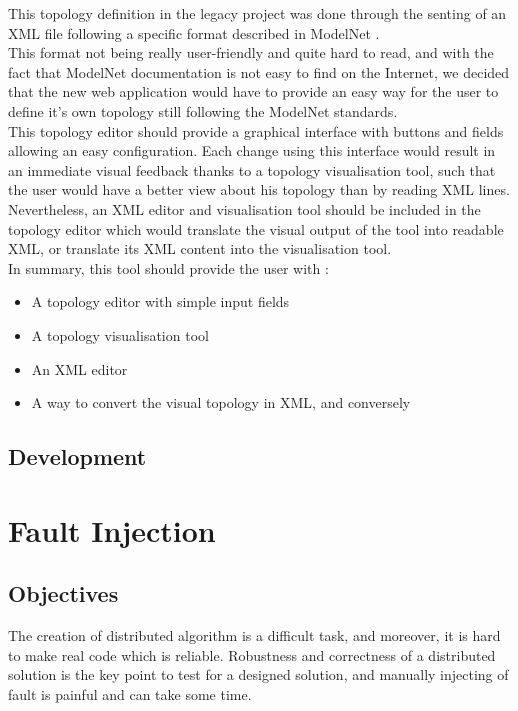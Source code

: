 \documentclass{eplmastersthesis}
\begin{document}
        This topology definition in the legacy project was done through
        the senting of an XML file following a specific format described
        in ModelNet \cite{ModelNet}.\\
        This format not being really user-friendly and quite hard to read,
        and with the fact that ModelNet documentation is not easy to find
        on the Internet, we decided that the new web application would have
        to provide an easy way for the user to define it's own topology
        still following the ModelNet standards.\\

        This topology editor should provide a graphical interface with
        buttons and fields allowing an easy configuration. Each change
        using this interface would result in an immediate visual feedback
        thanks to a topology visualisation tool, such that the user would
        have a better view about his topology than by reading XML lines.
        Nevertheless, an XML editor and visualisation tool should be included
        in the topology editor which would translate the visual output of
        the tool into readable XML, or translate its XML content into the
        visualisation tool.\\

        In summary, this tool should provide the user with :

        \begin{itemize}
          \item A topology editor with simple input fields
          \item A topology visualisation tool
          \item An XML editor
          \item A way to convert the visual topology in XML, and conversely
        \end{itemize}
      \subsection{Development}

    \section{Fault Injection}

      \subsection{Objectives}
        The creation of distributed algorithm is a difficult task, and
        moreover, it is hard to make real code which is reliable. Robustness
        and correctness of a distributed solution is the key point to test
        for a designed solution, and manually injecting of fault is painful
        and can take some time. \\
\end{document}
